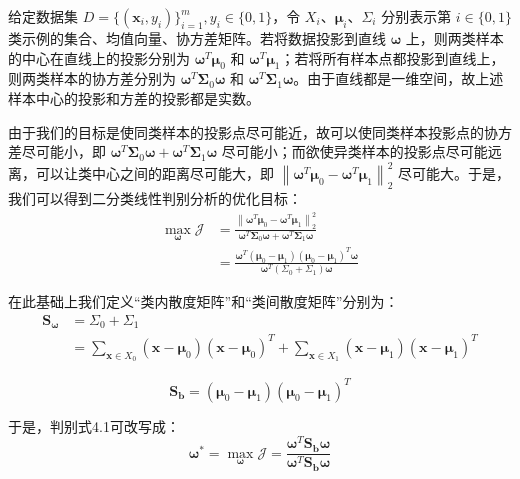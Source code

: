 \documentclass[UTF8, a4paper, 12pt]{report}
\begin{document}
			给定数据集 $D=\{(\bm{x}_i, y_i)\}_{i=1}^{m}, y_i \in \{0, 1\}$，令 $X_i、\bm{\mu} _i、\Sigma_i$ 分别表示第 $i \in \{0, 1\}$ 类示例的集合、均值向量、协方差矩阵。若将数据投影到直线 $\bm{\omega}$ 上，则两类样本的中心在直线上的投影分别为 $\bm{\omega}^T\bm{\mu}_0$ 和 $\bm{\omega}^T\bm{\mu}_1$；若将所有样本点都投影到直线上，则两类样本的协方差分别为 $\bm{\omega}^T \bm{\Sigma}_0 \bm{\omega}$ 和 $\bm{\omega}^T \bm{\Sigma}_1 \bm{\omega}$。由于直线都是一维空间，故上述样本中心的投影和方差的投影都是实数。

			由于我们的目标是使同类样本的投影点尽可能近，故可以使同类样本投影点的协方差尽可能小，即 $\bm{\omega}^T \bm{\Sigma}_0 \bm{\omega}+\bm{\omega}^T \bm{\Sigma}_1 \bm{\omega}$ 尽可能小；而欲使异类样本的投影点尽可能远离，可以让类中心之间的距离尽可能大，即 $ \left\|\bm{\omega}^T \bm{\mu} _0 - \bm{\omega}^T \bm{\mu} _1\right\|_2^2 $ 尽可能大。于是，我们可以得到二分类线性判别分析的优化目标：
			\begin{equation}
			\begin{aligned}
				\max_{\bm{\omega}} \mathcal{J} &= \frac{ \left\|\bm{\omega}^T \bm{\mu} _0 - \bm{\omega}^T \bm{\mu} _1\right\|_2^2 }{\bm{\omega}^T \bm{\Sigma}_0 \bm{\omega}+\bm{\omega}^T \bm{\Sigma}_1 \bm{\omega}} \\
				&= \frac{\bm{\omega}^T (\bm{\mu}_0-\bm{\mu}_1)(\bm{\mu}_0-\bm{\mu}_1)^T \bm{\omega}}{\bm{\omega}^T(\Sigma_0+\Sigma_1)\bm{\omega}}
			\end{aligned}
			\end{equation}

			在此基础上我们定义“类内散度矩阵”和“类间散度矩阵”分别为：
			\begin{equation}
			\begin{aligned}
				\bm{S}_{\bm{\omega}} &= \Sigma _0 + \Sigma _1\\
				&= \sum_{\bm{x} \in X_0} {(\bm{x}-\bm{\mu} _0)(\bm{x} - \bm{\mu} _0)^T} + \sum_{\bm{x} \in X_1} {(\bm{x}-\bm{\mu}_1)(\bm{x}-\bm{\mu}_1)^T}
			\end{aligned}
			\end{equation}

			\begin{equation}
				\bm{S}_{\bm{b}} = (\bm{\mu}_0-\bm{\mu}_1)(\bm{\mu}_0-\bm{\mu}_1)^T
			\end{equation}

			于是，判别式4.1可改写成：
			\begin{equation}
				\bm{\omega} ^* = \max_{\bm{\omega}} \mathcal{J} = \frac{\bm{\omega}^T \bm{S}_{\bm{b}} \bm{\omega}}{\bm{\omega}^T \bm{S}_{\bm{b}} \bm{\omega}}
			\end{equation}
\end{document}
